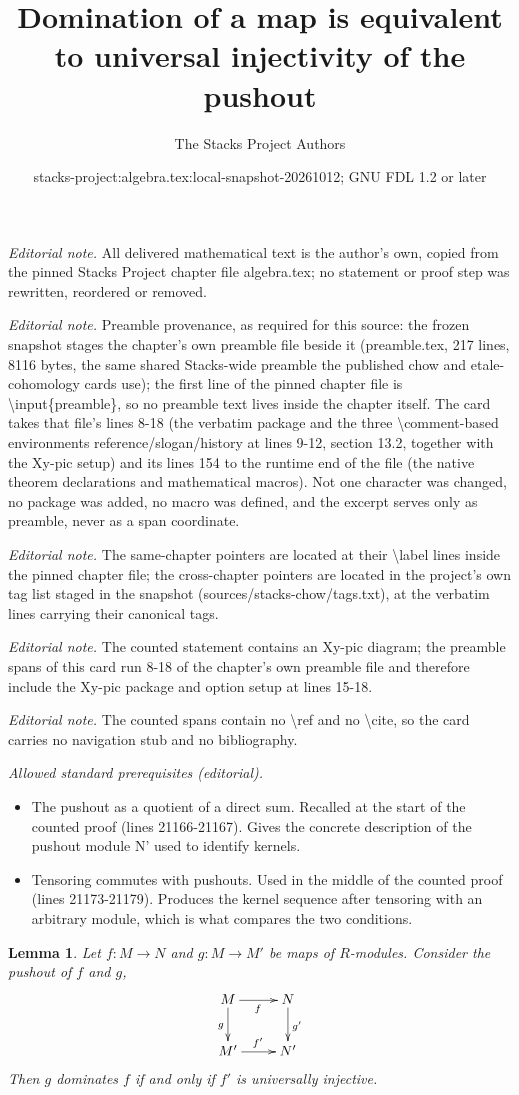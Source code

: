 \documentclass[10pt,a4paper]{amsart}
\title{Domination of a map is equivalent to universal injectivity of the pushout}
\author{The Stacks Project Authors}
\date{stacks-project:algebra.tex:local-snapshot-20261012; GNU FDL 1.2 or later}
\theoremstyle{plain}
\newtheorem{lemma}[subsection]{Lemma}
\theoremstyle{definition}
\theoremstyle{remark}
\numberwithin{equation}{subsection}
\begin{document}
\maketitle
\noindent\textit{Editorial note.} All delivered mathematical text is the author's own, copied from the pinned Stacks Project chapter file algebra.tex; no statement or proof step was rewritten, reordered or removed.\par\medskip
\noindent\textit{Editorial note.} Preamble provenance, as required for this source: the frozen snapshot stages the chapter's own preamble file beside it (preamble.tex, 217 lines, 8116 bytes, the same shared Stacks-wide preamble the published chow and etale-cohomology cards use); the first line of the pinned chapter file is \textbackslash{}input\{preamble\}, so no preamble text lives inside the chapter itself. The card takes that file's lines 8-18 (the verbatim package and the three \textbackslash{}comment-based environments reference/slogan/history at lines 9-12, section 13.2, together with the Xy-pic setup) and its lines 154 to the runtime end of the file (the native theorem declarations and mathematical macros). Not one character was changed, no package was added, no macro was defined, and the excerpt serves only as preamble, never as a span coordinate.\par\medskip
\noindent\textit{Editorial note.} The same-chapter pointers are located at their \textbackslash{}label lines inside the pinned chapter file; the cross-chapter pointers are located in the project's own tag list staged in the snapshot (sources/stacks-chow/tags.txt), at the verbatim lines carrying their canonical tags.\par\medskip
\noindent\textit{Editorial note.} The counted statement contains an Xy-pic diagram; the preamble spans of this card run 8-18 of the chapter's own preamble file and therefore include the Xy-pic package and option setup at lines 15-18.\par\medskip
\noindent\textit{Editorial note.} The counted spans contain no \textbackslash{}ref and no \textbackslash{}cite, so the card carries no navigation stub and no bibliography.\par\medskip
\noindent\textit{Allowed standard prerequisites (editorial).}\begin{itemize}
\item The pushout as a quotient of a direct sum. Recalled at the start of the counted proof (lines 21166-21167). Gives the concrete description of the pushout module N' used to identify kernels.
\item Tensoring commutes with pushouts. Used in the middle of the counted proof (lines 21173-21179). Produces the kernel sequence after tensoring with an arbitrary module, which is what compares the two conditions.
\end{itemize}\medskip
\begin{lemma}
\label{lemma-domination-universally-injective}
Let $f : M \to N$ and $g : M \to M'$ be maps of $R$-modules.
Consider the pushout of $f$ and $g$,
$$
\xymatrix{
M  \ar[r]_f \ar[d]_g & N \ar[d]^{g'} \\
M' \ar[r]^{f'} & N'
}
$$
Then $g$ dominates $f$ if and only if $f'$ is universally injective.
\end{lemma}
\end{document}
